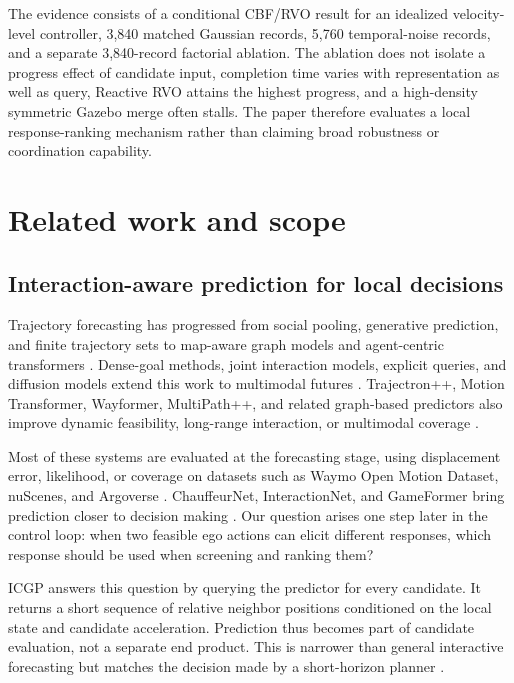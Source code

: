 \documentclass[pdflatex,sn-mathphys-num]{sn-jnl}
\begin{document}
The evidence consists of a conditional CBF/RVO result for an idealized velocity-level controller, 3,840 matched Gaussian records, 5,760 temporal-noise records, and a separate 3,840-record factorial ablation. The ablation does not isolate a progress effect of candidate input, completion time varies with representation as well as query, Reactive RVO attains the highest progress, and a high-density symmetric Gazebo merge often stalls. The paper therefore evaluates a local response-ranking mechanism rather than claiming broad robustness or coordination capability.
\section{Related work and scope}
\label{sec:related}

\subsection{Interaction-aware prediction for local decisions}

Trajectory forecasting has progressed from social pooling, generative prediction, and finite trajectory sets \cite{sociallstm2016,socialgan2018,convsocial2018,sophie2019,covernet2020} to map-aware graph models and agent-centric transformers \cite{vectornet2020,lanegcn2020,lanercnn2021,agentformer2021,hivt2022}. Dense-goal methods, joint interaction models, explicit queries, and diffusion models extend this work to multimodal futures \cite{densetnt2021,m2i2022,qcnet2023,motiondiffuser2023}. Trajectron++, Motion Transformer, Wayformer, MultiPath++, and related graph-based predictors also improve dynamic feasibility, long-range interaction, or multimodal coverage \cite{salzmann2020,shi2022,nayakanti2023,chai2020,varadarajan2022,mohamed2020}.

Most of these systems are evaluated at the forecasting stage, using displacement error, likelihood, or coverage on datasets such as Waymo Open Motion Dataset, nuScenes, and Argoverse \cite{ettinger2021,nuscenes2020,chang2019}. ChauffeurNet, InteractionNet, and GameFormer bring prediction closer to decision making \cite{chauffeurnet2019,interactionnet2023,gameformer2023}. Our question arises one step later in the control loop: when two feasible ego actions can elicit different responses, which response should be used when screening and ranking them?

ICGP answers this question by querying the predictor for every candidate. It returns a short sequence of relative neighbor positions conditioned on the local state and candidate acceleration. Prediction thus becomes part of candidate evaluation, not a separate end product. This is narrower than general interactive forecasting but matches the decision made by a short-horizon planner \cite{tolstaya2021}.
\end{document}
